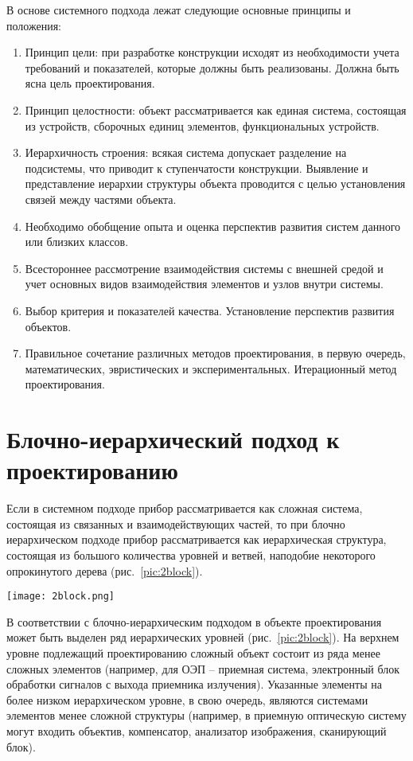 В основе системного подхода лежат следующие основные принципы и положения:
\begin{enumerate}
	\item Принцип цели: при разработке конструкции исходят из необходимости учета требований и показателей, которые должны быть реализованы. Должна быть ясна цель проектирования.
	\item Принцип целостности: объект рассматривается как единая система, состоящая из устройств, сборочных единиц элементов, функциональных устройств.
	\item Иерархичность строения: всякая система допускает разделение на подсистемы, что приводит к ступенчатости конструкции. Выявление и представление иерархии структуры объекта проводится с целью установления связей между частями объекта.
	\item Необходимо обобщение опыта и оценка перспектив развития систем данного или близких классов.
	\item Всестороннее рассмотрение взаимодействия системы с внешней средой и учет основных видов взаимодействия элементов и узлов внутри системы.
	\item Выбор критерия и показателей качества. Установление перспектив развития объектов.
	\item Правильное сочетание различных методов проектирования, в первую очередь, математических, эвристических и экспериментальных. Итерационный метод проектирования.
\end{enumerate}

\section{Блочно-иерархический подход к проектированию}

Если в системном подходе прибор рассматривается как сложная система, состоящая из связанных и взаимодействующих частей, то при блочно иерархическом подходе прибор рассматривается как иерархическая структура, состоящая из большого количества уровней и ветвей, наподобие некоторого опрокинутого дерева (рис.~\ref{pic:2block}).

\begin{figure*}[h]
	\texttt{[image: 2block.png]}
	\caption{Блочно-иерархический подход к проектированию}
	\label{pic:2block}
\end{figure*}

В соответствии с блочно-иерархическим подходом в объекте проектирования может быть выделен ряд иерархических уровней (рис.~\ref{pic:2block}). На верхнем уровне подлежащий проектированию сложный объект состоит из ряда менее сложных элементов (например, для ОЭП -- приемная система, электронный блок обработки сигналов с выхода приемника излучения). Указанные элементы на более низком иерархическом уровне, в свою очередь, являются системами элементов менее сложной структуры (например, в приемную оптическую систему могут входить объектив, компенсатор, анализатор изображения, сканирующий блок). 

